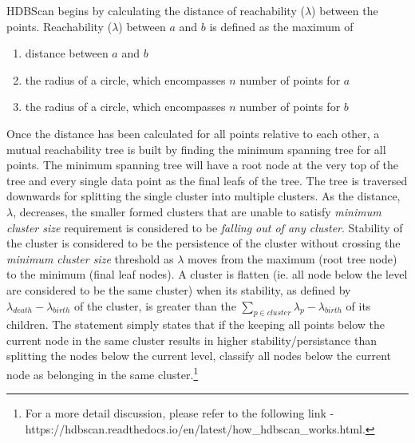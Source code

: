 \documentclass{article}
\begin{document}
HDBScan begins by calculating the distance of reachability ($\lambda$) between the points. Reachability ($\lambda$) between $a$ and $b$ is defined as the maximum of
\begin{enumerate}
\item distance between $a$ and $b$
\item the radius of a circle, which encompasses $n$ number of points for $a$
\item the radius of a circle, which encompasses $n$ number of points for $b$
\end{enumerate}
Once the distance has been calculated for all points relative to each other, a mutual reachability tree is built by finding the minimum spanning tree for all points. The minimum spanning tree will have a root node at the very top of the tree and every single data point as the final leafs of the tree. The tree is traversed downwards for splitting the single cluster into multiple clusters. As the distance, $\lambda$, decreases, the smaller formed clusters that are unable to satisfy \textit{minimum cluster size} requirement is considered to be \textit{falling out of any cluster}. Stability of the cluster is considered to be the persistence of the cluster without crossing the \textit{minimum cluster size} threshold as $\lambda$ moves from the maximum (root tree node) to the minimum (final leaf nodes). A cluster is flatten (ie. all node below the level are considered to be the same cluster) when its stability, as defined by $\lambda_{death}-\lambda_{birth}$ of the cluster, is greater than the $\sum_{p \in cluster} \lambda_p-\lambda_{birth}$ of its children.  The statement simply states that if the keeping all points below the current node in the same cluster results in higher stability/persistance than splitting the nodes below the current level, classify all nodes below the current node as belonging in the same cluster.\footnote{For a more detail discussion, please refer to the following link - https://hdbscan.readthedocs.io/en/latest/how\_hdbscan\_works.html.}
\end{document}
